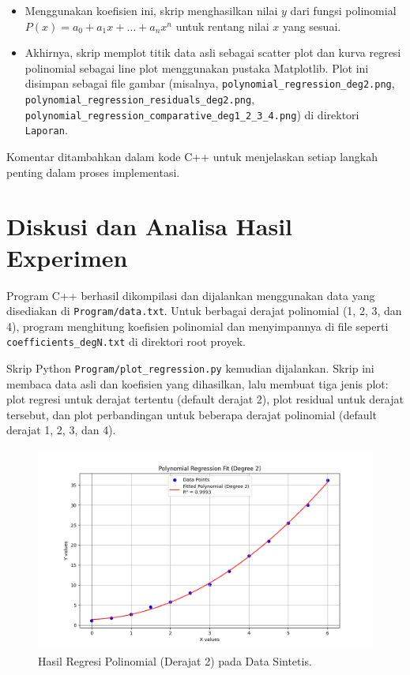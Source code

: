 \documentclass[conference]{IEEEtran}
\begin{document}
\begin{enumerate}
\begin{itemize}
        \item Menggunakan koefisien ini, skrip menghasilkan nilai $y$ dari fungsi polinomial $P(x) = a_0 + a_1x + \dots + a_nx^n$ untuk rentang nilai $x$ yang sesuai.
        \item Akhirnya, skrip memplot titik data asli sebagai scatter plot dan kurva regresi polinomial sebagai line plot menggunakan pustaka Matplotlib. Plot ini disimpan sebagai file gambar (misalnya, \texttt{polynomial\_regression\_deg2.png}, \texttt{polynomial\_regression\_residuals\_deg2.png}, \texttt{polynomial\_regression\_comparative\_deg1\_2\_3\_4.png}) di direktori \texttt{Laporan}.
    \end{itemize}
\end{enumerate}
Komentar ditambahkan dalam kode C++ untuk menjelaskan setiap langkah penting dalam proses implementasi.

\section{Diskusi dan Analisa Hasil Experimen}
Program C++ berhasil dikompilasi dan dijalankan menggunakan data yang disediakan di \texttt{Program/data.txt}. Untuk berbagai derajat polinomial (1, 2, 3, dan 4), program menghitung koefisien polinomial dan menyimpannya di file seperti \texttt{coefficients\_degN.txt} di direktori root proyek.

Skrip Python \texttt{Program/plot\_regression.py} kemudian dijalankan. Skrip ini membaca data asli dan koefisien yang dihasilkan, lalu membuat tiga jenis plot: plot regresi untuk derajat tertentu (default derajat 2), plot residual untuk derajat tersebut, dan plot perbandingan untuk beberapa derajat polinomial (default derajat 1, 2, 3, dan 4).

\begin{figure}[htbp]
\centerline{\includegraphics[width=0.9\columnwidth]{polynomial_regression_deg2.png}}
\caption{Hasil Regresi Polinomial (Derajat 2) pada Data Sintetis.}
\label{fig:poly_plot_deg2}
\end{figure}
\end{document}
